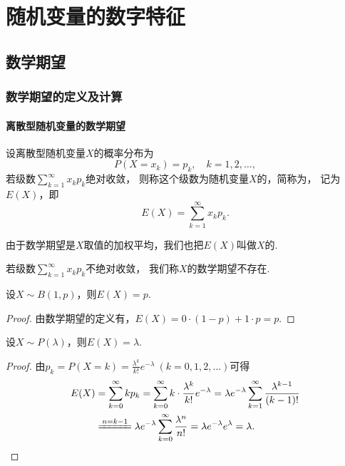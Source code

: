 \chapter{随机变量的数字特征}
\section{数学期望}
\subsection{数学期望的定义及计算}
\subsubsection{离散型随机变量的数学期望}
\begin{definition}
设离散型随机变量\(X\)的概率分布为\[
P(X=x_k) = p_k, \quad k=1,2,\dotsc,
\]若级数\(\sum\limits_{k=1}^\infty {x_k p_k}\)绝对收敛，
则称这个级数为随机变量\(X\)的，简称为，
记为\(E(X)\)，即\begin{equation}\label{equation:随机变量的数字特征.数学期望的定义式}
E(X) = \sum\limits_{k=1}^\infty x_k p_k.
\end{equation}

由于数学期望是\(X\)取值的加权平均，我们也把\(E(X)\)叫做\(X\)的.

若级数\(\sum\limits_{k=1}^\infty x_k p_k\)不绝对收敛，
我们称\(X\)的数学期望不存在.
\end{definition}

\begin{theorem}\label{theorem:随机变量的数字特征.0-1分布的数学期望}
设\(X \sim B(1,p)\)，则\(E(X) = p\).
\begin{proof}
由数学期望的定义有，\(E(X) = 0 \cdot (1-p) + 1 \cdot p = p\).
\end{proof}
\end{theorem}

\begin{theorem}\label{theorem:随机变量的数字特征.泊松分布的数学期望}
设\(X \sim P(\lambda)\)，则\(E(X) = \lambda\).
\begin{proof}
由\(p_k = P(X=k) = \frac{\lambda^k}{k!} e^{-\lambda}\ (k=0,1,2,\dotsc)\)可得
\begin{align*}
E(X) &= \sum\limits_{k=0}^\infty {k p_k}
= \sum\limits_{k=0}^\infty {k \cdot \frac{\lambda^k}{k!} e^{-\lambda}}
= \lambda e^{-\lambda} \sum\limits_{k=1}^\infty {\frac{\lambda^{k-1}}{(k-1)!}} \\
&\xlongequal{n=k-1} \lambda e^{-\lambda} \sum\limits_{k=0}^\infty {\frac{\lambda^n}{n!}}
= \lambda e^{-\lambda} e^{\lambda} = \lambda.
\qedhere
\end{align*}
\end{proof}
\end{theorem}

